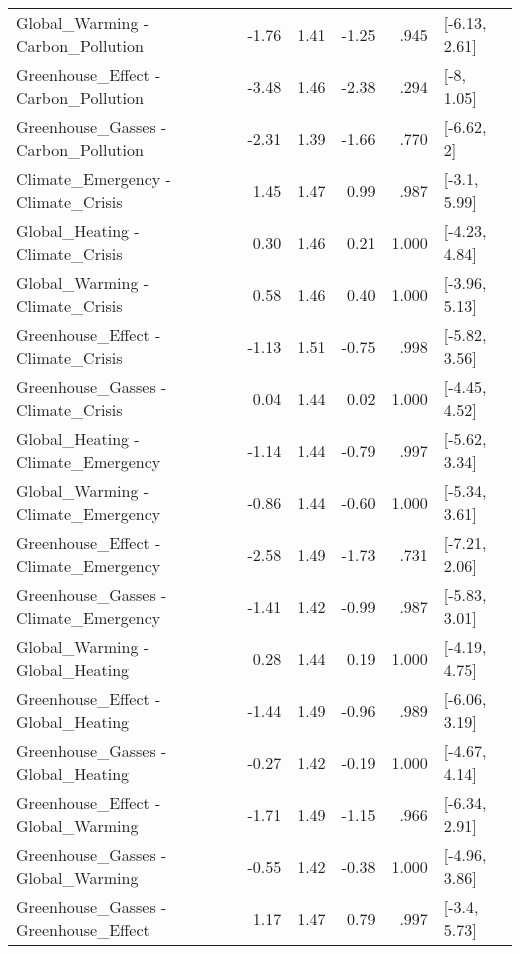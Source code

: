 \begin{table}[ht]
\begin{tabular}{lrrrrl}
  Global\_Warming - Carbon\_Pollution & -1.76 & 1.41 & -1.25 & .945 & [-6.13, 2.61] \\ 
  Greenhouse\_Effect - Carbon\_Pollution & -3.48 & 1.46 & -2.38 & .294 & [-8, 1.05] \\ 
  Greenhouse\_Gasses - Carbon\_Pollution & -2.31 & 1.39 & -1.66 & .770 & [-6.62, 2] \\ 
  Climate\_Emergency - Climate\_Crisis & 1.45 & 1.47 & 0.99 & .987 & [-3.1, 5.99] \\ 
  Global\_Heating - Climate\_Crisis & 0.30 & 1.46 & 0.21 & 1.000 & [-4.23, 4.84] \\ 
  Global\_Warming - Climate\_Crisis & 0.58 & 1.46 & 0.40 & 1.000 & [-3.96, 5.13] \\ 
  Greenhouse\_Effect - Climate\_Crisis & -1.13 & 1.51 & -0.75 & .998 & [-5.82, 3.56] \\ 
  Greenhouse\_Gasses - Climate\_Crisis & 0.04 & 1.44 & 0.02 & 1.000 & [-4.45, 4.52] \\ 
  Global\_Heating - Climate\_Emergency & -1.14 & 1.44 & -0.79 & .997 & [-5.62, 3.34] \\ 
  Global\_Warming - Climate\_Emergency & -0.86 & 1.44 & -0.60 & 1.000 & [-5.34, 3.61] \\ 
  Greenhouse\_Effect - Climate\_Emergency & -2.58 & 1.49 & -1.73 & .731 & [-7.21, 2.06] \\ 
  Greenhouse\_Gasses - Climate\_Emergency & -1.41 & 1.42 & -0.99 & .987 & [-5.83, 3.01] \\ 
  Global\_Warming - Global\_Heating & 0.28 & 1.44 & 0.19 & 1.000 & [-4.19, 4.75] \\ 
  Greenhouse\_Effect - Global\_Heating & -1.44 & 1.49 & -0.96 & .989 & [-6.06, 3.19] \\ 
  Greenhouse\_Gasses - Global\_Heating & -0.27 & 1.42 & -0.19 & 1.000 & [-4.67, 4.14] \\ 
  Greenhouse\_Effect - Global\_Warming & -1.71 & 1.49 & -1.15 & .966 & [-6.34, 2.91] \\ 
  Greenhouse\_Gasses - Global\_Warming & -0.55 & 1.42 & -0.38 & 1.000 & [-4.96, 3.86] \\ 
  Greenhouse\_Gasses - Greenhouse\_Effect & 1.17 & 1.47 & 0.79 & .997 & [-3.4, 5.73] \\ 
   \hline
\end{tabular}
\end{table}

